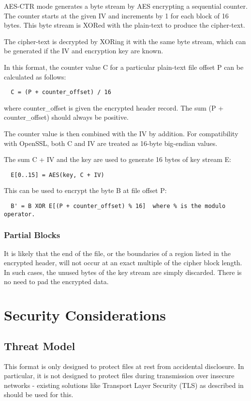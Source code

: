 \documentclass[10pt]{article}
\begin{document}
{AES-CTR mode generates a byte stream by AES encrypting a sequential counter.
The counter starts at the given IV and increments by 1 for each block of 16 bytes.
This byte stream is XORed with the plain-text to produce the cipher-text.

The cipher-text is decrypted by XORing it with the same byte stream, which can be generated if the IV and encryption
key are known.

In this format, the counter value C for a particular plain-text file offset P can be calculated as follows:
\begin{verbatim}
  C = (P + counter_offset) / 16
\end{verbatim}
where counter\_offset is given the encrypted header record.
The sum (P + counter\_offset) should always be positive.

The counter value is then combined with the IV by addition.
For compatibility with OpenSSL, both C and IV are treated as 16-byte big-endian values.

The sum C + IV and the key are used to generate 16 bytes of key stream E:
\begin{verbatim}
  E[0..15] = AES(key, C + IV)
\end{verbatim}
  This can be used to encrypt the byte B at file offset P:
\begin{verbatim}
  B' = B XOR E[(P + counter_offset) % 16]  where % is the modulo operator.
\end{verbatim}

\subsubsection{Partial Blocks}
It is likely that the end of the file, or the boundaries of a region listed in the encrypted header, will not occur at
an exact multiple of the cipher block length.
In such cases, the unused bytes of the key stream are simply discarded.
There is no need to pad the encrypted data.

\section{Security Considerations}
\subsection{Threat Model}
This format is only designed to protect files at rest from accidental disclosure.
In particular, it is not designed to protect files during transmission over insecure networks - existing solutions like
Transport Layer Security (TLS) as described in \cite{RFC5246} should be used for this.

}
\end{document}

